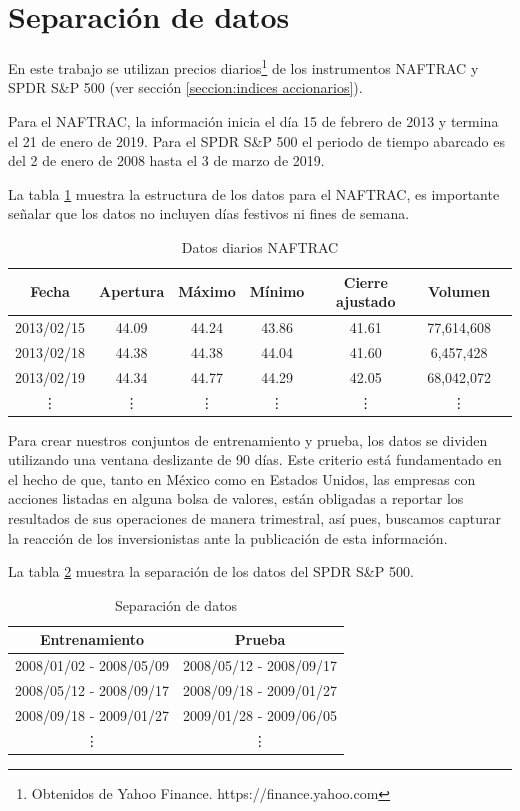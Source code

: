 \documentclass[12pt]{scrbook}
\theoremstyle{break}
\theoremstyle{break}
\begin{document}
\section{Separación de datos}
\label{seccion:separacion de datos}
En este trabajo se utilizan precios diarios\footnote{Obtenidos de Yahoo Finance. https://finance.yahoo.com} de los instrumentos NAFTRAC y SPDR S\&P 500 (ver sección \ref{seccion:indices accionarios}).

Para el NAFTRAC, la información inicia el día 15 de febrero de 2013 y termina el 21 de enero de 2019. Para el SPDR S\&P 500 el periodo de tiempo abarcado es del 2 de enero de 2008 hasta  el 3 de marzo de 2019.

La tabla \ref{tabla:Ejemplo datos diarios NAFTRAC} muestra la estructura de los datos para el NAFTRAC, es importante señalar que los datos no incluyen días festivos ni fines de semana.

\begin{table}[h]
\centering
\begin{tabular}{ccccccc}
\hline
\textbf{Fecha} & \textbf{Apertura} & \textbf{Máximo} & \textbf{Mínimo} & \textbf{Cierre  ajustado} &  \textbf{Volumen} \\
\hline
2013/02/15 & 44.09 & 44.24 & 43.86  & 41.61 & 77,614,608\\
2013/02/18 & 44.38 & 44.38 & 44.04  & 41.60 & 6,457,428\\
2013/02/19 & 44.34 & 44.77 & 44.29  & 42.05 & 68,042,072\\
\vdots & \vdots & \vdots & \vdots  & \vdots & \vdots \\
\hline
\end{tabular}
\caption{\label{tabla:Ejemplo datos diarios NAFTRAC} Datos diarios NAFTRAC}
\end{table}

Para crear nuestros conjuntos de entrenamiento y prueba, los datos se dividen utilizando una ventana deslizante de 90 días. Este criterio está fundamentado en el hecho de que, tanto en México como en Estados Unidos, las empresas con acciones listadas en alguna bolsa de valores, están obligadas a reportar los resultados de sus operaciones de manera trimestral, así pues, buscamos capturar la reacción de los inversionistas ante la publicación de esta información.

La tabla \ref{tabla:data split SP500} muestra la separación de los datos del SPDR S\&P 500.
\begin{table}[h]
\centering
\begin{tabular}{cc}
\hline
\textbf{Entrenamiento} & \textbf{Prueba} \\
\hline
2008/01/02 - 2008/05/09 & 2008/05/12 - 2008/09/17 \\
2008/05/12 - 2008/09/17 & 2008/09/18 - 2009/01/27 \\
2008/09/18 - 2009/01/27 & 2009/01/28 - 2009/06/05 \\
\vdots & \vdots \\
\hline
\end{tabular}
\caption{\label{tabla:data split SP500} Separación de datos}
\end{table}
\end{document}
